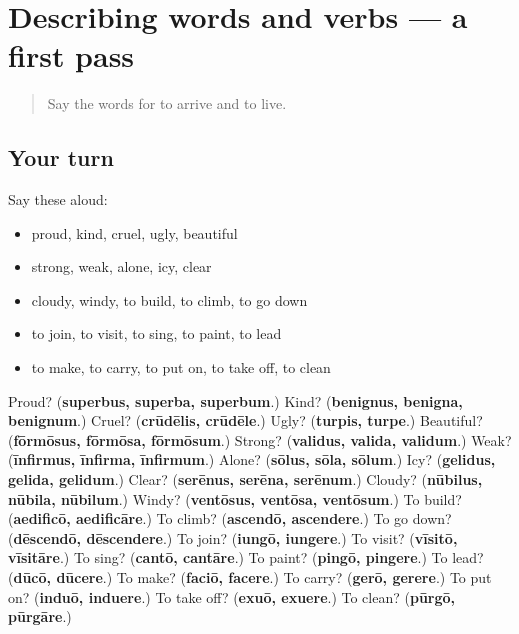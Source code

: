 \section[(dialogue)]{Describing words and verbs — a first pass}

\label{lesson:LA-R160-first-pass-describing-words-and-verbs}



\begin{quote}
Say the words for to arrive and to live.
\end{quote}

\subsection*{Your turn}
Say these aloud:

\begin{itemize}
\raggedright
  \item proud, kind, cruel, ugly, beautiful
  \item strong, weak, alone, icy, clear
  \item cloudy, windy, to build, to climb, to go down
  \item to join, to visit, to sing, to paint, to lead
  \item to make, to carry, to put on, to take off, to clean
\end{itemize}

\begin{tcolorbox}[breakable,colback=teal!4,colframe=teal!35!black,title={Before you move on}]
Proud? (\textbf{superbus, superba, superbum}.) Kind? (\textbf{benignus, benigna, benignum}.) Cruel? (\textbf{crūdēlis, crūdēle}.) Ugly? (\textbf{turpis, turpe}.) Beautiful? (\textbf{fōrmōsus, fōrmōsa, fōrmōsum}.) Strong? (\textbf{validus, valida, validum}.) Weak? (\textbf{īnfirmus, īnfirma, īnfirmum}.) Alone? (\textbf{sōlus, sōla, sōlum}.) Icy? (\textbf{gelidus, gelida, gelidum}.) Clear? (\textbf{serēnus, serēna, serēnum}.) Cloudy? (\textbf{nūbilus, nūbila, nūbilum}.) Windy? (\textbf{ventōsus, ventōsa, ventōsum}.) To build? (\textbf{aedificō, aedificāre}.) To climb? (\textbf{ascendō, ascendere}.) To go down? (\textbf{dēscendō, dēscendere}.) To join? (\textbf{iungō, iungere}.) To visit? (\textbf{vīsitō, vīsitāre}.) To sing? (\textbf{cantō, cantāre}.) To paint? (\textbf{pingō, pingere}.) To lead? (\textbf{dūcō, dūcere}.) To make? (\textbf{faciō, facere}.) To carry? (\textbf{gerō, gerere}.) To put on? (\textbf{induō, induere}.) To take off? (\textbf{exuō, exuere}.) To clean? (\textbf{pūrgō, pūrgāre}.)
\end{tcolorbox}
